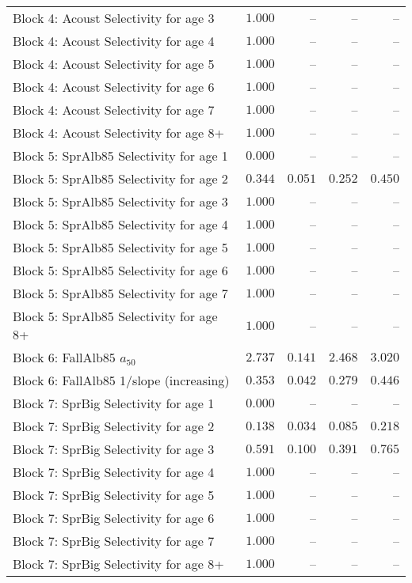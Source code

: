 \documentclass[
]{article}
\begin{document}
\begin{landscape}
\begin{longtable}[t]{lrrrr}
Block 4: Acoust Selectivity for age 3 & $1.000$ & -- & -- & --\\
Block 4: Acoust Selectivity for age 4 & $1.000$ & -- & -- & --\\
Block 4: Acoust Selectivity for age 5 & $1.000$ & -- & -- & --\\
Block 4: Acoust Selectivity for age 6 & $1.000$ & -- & -- & --\\
\addlinespace
Block 4: Acoust Selectivity for age 7 & $1.000$ & -- & -- & --\\
Block 4: Acoust Selectivity for age 8+ & $1.000$ & -- & -- & --\\
Block 5: SprAlb85 Selectivity for age 1 & $0.000$ & -- & -- & --\\
Block 5: SprAlb85 Selectivity for age 2 & $0.344$ & $0.051$ & $0.252$ & $0.450$\\
Block 5: SprAlb85 Selectivity for age 3 & $1.000$ & -- & -- & --\\
\addlinespace
Block 5: SprAlb85 Selectivity for age 4 & $1.000$ & -- & -- & --\\
Block 5: SprAlb85 Selectivity for age 5 & $1.000$ & -- & -- & --\\
Block 5: SprAlb85 Selectivity for age 6 & $1.000$ & -- & -- & --\\
Block 5: SprAlb85 Selectivity for age 7 & $1.000$ & -- & -- & --\\
Block 5: SprAlb85 Selectivity for age 8+ & $1.000$ & -- & -- & --\\
\addlinespace
Block 6: FallAlb85 $a_{50}$ & $2.737$ & $0.141$ & $2.468$ & $3.020$\\
Block 6: FallAlb85 1/slope (increasing) & $0.353$ & $0.042$ & $0.279$ & $0.446$\\
Block 7: SprBig Selectivity for age 1 & $0.000$ & -- & -- & --\\
Block 7: SprBig Selectivity for age 2 & $0.138$ & $0.034$ & $0.085$ & $0.218$\\
Block 7: SprBig Selectivity for age 3 & $0.591$ & $0.100$ & $0.391$ & $0.765$\\
\addlinespace
Block 7: SprBig Selectivity for age 4 & $1.000$ & -- & -- & --\\
Block 7: SprBig Selectivity for age 5 & $1.000$ & -- & -- & --\\
Block 7: SprBig Selectivity for age 6 & $1.000$ & -- & -- & --\\
Block 7: SprBig Selectivity for age 7 & $1.000$ & -- & -- & --\\
Block 7: SprBig Selectivity for age 8+ & $1.000$ & -- & -- & --\\

\end{longtable}
\end{landscape}
\end{document}
